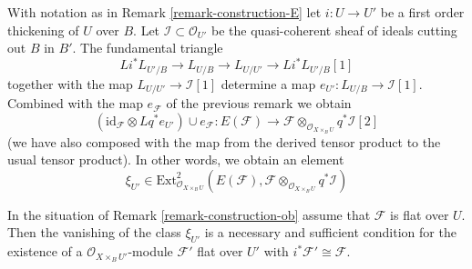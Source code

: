 \begin{remark}
\label{remark-construction-ob}
With notation as in Remark \ref{remark-construction-E} let $i : U \to U'$ be a
first order thickening of $U$ over $B$. Let
$\mathcal{I} \subset \mathcal{O}_{U'}$ be the quasi-coherent sheaf of
ideals cutting out $B$ in $B'$. The fundamental triangle
$$
Li^*L_{U'/B} \to L_{U/B} \to L_{U/U'} \to Li^*L_{U'/B}[1]
$$
together with the map $L_{U/U'} \to \mathcal{I}[1]$ determine a
map $e_{U'} : L_{U/B} \to \mathcal{I}[1]$. Combined with the map
$e_\mathcal{F}$ of the previous remark we obtain
$$
(\text{id}_\mathcal{F} \otimes Lq^*e_{U'}) \cup e_\mathcal{F} :
E(\mathcal{F})
\longrightarrow
\mathcal{F} \otimes_{\mathcal{O}_{X \times_B U}} q^*\mathcal{I}[2]
$$
(we have also composed with the map from the derived tensor product to
the usual tensor product). In other words, we obtain an element
$$
\xi_{U'} \in
\text{Ext}^2_{\mathcal{O}_{X \times_B U}}(
E(\mathcal{F}),
\mathcal{F} \otimes_{\mathcal{O}_{X \times_B U}} q^*\mathcal{I})
$$
\end{remark}

\begin{lemma}
\label{lemma-ob-is-obstruction}
In the situation of Remark \ref{remark-construction-ob} assume that
$\mathcal{F}$ is flat over $U$. Then the vanishing of the class
$\xi_{U'}$ is a necessary and sufficient condition for the existence of a
$\mathcal{O}_{X \times_B U'}$-module $\mathcal{F}'$ flat over $U'$
with $i^*\mathcal{F}' \cong \mathcal{F}$.
\end{lemma}

